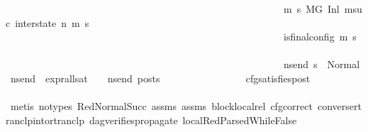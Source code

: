 \begin{isabellebody}
\ \ \ \ \ \ \ \ \ \ \ \ \ \ \ \ \ \ \ \ \ \ \ \ \ \ \ \ \ \ \ \ \ \ \ \ \ \ \ \ \ \ \ \ \ \ \ \ \ \ \ \ \ \ \ \ {\isacharparenleft}{\kern0pt}{\isasymforall}m{\isacharprime}{\kern0pt}\ s{\isacharprime}{\kern0pt}{\isachardot}{\kern0pt}\ {\isacharparenleft}{\kern0pt}{\isacharparenleft}{\kern0pt}{\isacharparenleft}{\kern0pt}M{\isacharcomma}{\kern0pt}{\isasymLambda}{\isacharcomma}{\kern0pt}{\isasymGamma}{\isacharcomma}{\kern0pt}{\isasymOmega}{\isacharcomma}{\kern0pt}G\ {\isasymturnstile}{\isacharparenleft}{\kern0pt}Inl\ {\isacharparenleft}{\kern0pt}msuc{}{\isacharparenright}{\kern0pt}{\isacharcomma}{\kern0pt}\ inter{\isacharunderscore}{\kern0pt}state{\isacharparenright}{\kern0pt}\ {\isacharminus}{\kern0pt}n{\isasymrightarrow}{\isacharasterisk}{\kern0pt}\ {\isacharparenleft}{\kern0pt}m{\isacharprime}{\kern0pt}{\isacharcomma}{\kern0pt}\ s{\isacharprime}{\kern0pt}{\isacharparenright}{\kern0pt}{\isacharparenright}{\kern0pt}{\isacharparenright}{\kern0pt}\ {\isasymlongrightarrow}\isanewline
\ \ \ \ \ \ \ \ \ \ \ \ \ \ \ \ \ \ \ \ \ \ \ \ \ \ \ \ \ \ \ \ \ \ \ \ \ \ \ \ \ \ \ \ \ \ \ \ \ \ \ \ \ \ \ \ is{\isacharunderscore}{\kern0pt}final{\isacharunderscore}{\kern0pt}config\ {\isacharparenleft}{\kern0pt}m{\isacharprime}{\kern0pt}{\isacharcomma}{\kern0pt}\ s{\isacharprime}{\kern0pt}{\isacharparenright}{\kern0pt}\ {\isasymlongrightarrow}\ \isanewline
\ \ \ \ \ \ \ \ \ \ \ \ \ \ \ \ \ \ \ \ \ \ \ \ \ \ \ \ \ \ \ \ \ \ \ \ \ \ \ \ \ \ \ \ \ \ \ \ \ \ \ \ \ \ \ \ {\isacharparenleft}{\kern0pt}{\isasymforall}ns{\isacharunderscore}{\kern0pt}end{\isachardot}{\kern0pt}\ s{\isacharprime}{\kern0pt}\ {\isacharequal}{\kern0pt}\ Normal\ ns{\isacharunderscore}{\kern0pt}end\ {\isasymlongrightarrow}\ {\isacharparenleft}{\kern0pt}expr{\isacharunderscore}{\kern0pt}all{\isacharunderscore}{\kern0pt}sat\ {\isasymLambda}\ {\isasymGamma}\ {\isasymOmega}\ ns{\isacharunderscore}{\kern0pt}end{\isacharparenright}{\kern0pt}\ posts{\isacharparenright}{\kern0pt}{\isacharparenright}{\kern0pt}{\isacharparenright}{\kern0pt}\ {\isacharparenright}{\kern0pt}{\isachardoublequoteclose}\isanewline
\ \ \ \ \ \ \ \ \ \ \ \ \ \ \isamarkupfalse%
\ cfg{\isacharunderscore}{\kern0pt}satisfies{\isacharunderscore}{\kern0pt}post\ \isanewline
\ \ \ \ \ \ \ \ \ \ \ \ \ \ \isamarkupfalse%
\ {\isacharparenleft}{\kern0pt}metis\ {\isacharparenleft}{\kern0pt}no{\isacharunderscore}{\kern0pt}types{\isacharparenright}{\kern0pt}\ RedNormalSucc\ assms{\isacharparenleft}{\kern0pt}{}{\isacharparenright}{\kern0pt}\ assms{\isacharparenleft}{\kern0pt}{}{\isacharparenright}{\kern0pt}\ block{\isacharunderscore}{\kern0pt}local{\isacharunderscore}{\kern0pt}rel\ cfg{\isacharunderscore}{\kern0pt}correct\ converse{\isacharunderscore}{\kern0pt}rtranclp{\isacharunderscore}{\kern0pt}into{\isacharunderscore}{\kern0pt}rtranclp\ dag{\isacharunderscore}{\kern0pt}verifies{\isacharunderscore}{\kern0pt}propagate{\isacharunderscore}{\kern0pt}{}\ local{\isachardot}{\kern0pt}RedParsedWhileFalse{\isacharparenleft}{\kern0pt}{}{\isacharparenright}{\kern0pt}{\isacharparenright}{\kern0pt}\isanewline

\end{isabellebody}
